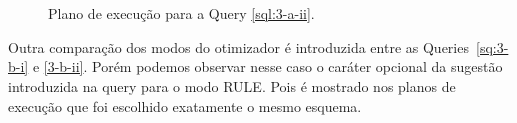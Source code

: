 \documentclass[a4paper,12pt]{article}
\begin{document}
\begin{figure}[hpt]
   \begin{center}
      \\
      \\
   \end{center}
   \caption{Plano de execução para a Query \ref{sql:3-a-ii}.}
   \label{fig:plano_3-a-ii}
\end{figure}

Outra comparação dos modos do otimizador é introduzida entre as Queries~\ref{sq:3-b-i} e \ref{3-b-ii}.
Porém podemos observar nesse caso o caráter opcional da sugestão introduzida na query para o modo RULE.
Pois é mostrado nos planos de execução que foi escolhido exatamente o mesmo esquema.

\begin{program}
   
   \caption{Pergunta 3 baseada em junção externa e filtragem para nulo com otimizador no modo CHOOSE.}
   \label{sql:3-b-i}
\end{program}
\end{document}
